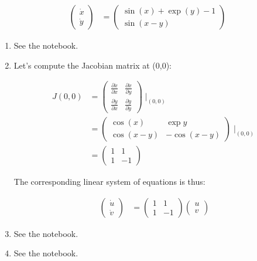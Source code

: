 \documentclass[12pt,letterpaper]{article}
\begin{document}
\begin{align}
	\begin{pmatrix}
		\dot{x} \\
		\dot{y}
	\end{pmatrix} & =
	\begin{pmatrix}
		\sin(x) + \exp(y) - 1 \\
		\sin(x - y)
	\end{pmatrix}
\end{align}
\begin{enumerate}[label=(\alph*)]
	\item See the notebook.
	\item
	      Let's compute the Jacobian matrix at (0,0):

	      \begin{align}
		      J(0,0) & =
		      \begin{pmatrix}
			      \frac{\partial \dot{x}}{\partial x} & \frac{\partial \dot{x}}{\partial y} \\
			      \frac{\partial \dot{y}}{\partial x} & \frac{\partial \dot{y}}{\partial y}
		      \end{pmatrix} \mid_{(0,0)}\\
		             & = \begin{pmatrix}
			      \cos(x)   & \exp{y}    \\
			      \cos(x-y) & -\cos(x-y)
		      \end{pmatrix} \mid_{(0,0)} \\
		             & = \begin{pmatrix}
			      1 & 1  \\
			      1 & -1
		      \end{pmatrix}
	      \end{align}

	      The corresponding linear system of equations is thus:

	      \begin{align}
		      \begin{pmatrix}
			      \dot{u} \\
			      \dot{v}
		      \end{pmatrix}
		        & =
		      \begin{pmatrix}
			      1 & 1  \\
			      1 & -1
		      \end{pmatrix}
		      \begin{pmatrix}
			      u \\
			      v
		      \end{pmatrix}
	      \end{align}
	\item See the notebook.
	\item See the notebook.
\end{enumerate}
\end{document}
